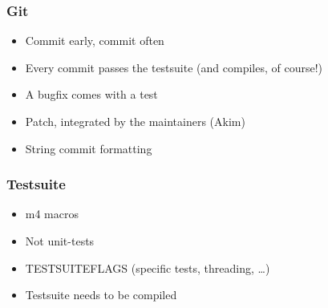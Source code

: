 \documentclass{beamer}
\begin{document}
\begin{frame}
  \frametitle{Git}
    \begin{itemize}
      \item Commit early, commit often
      \item Every commit passes the testsuite (and compiles, of course!)
      \item A bugfix comes with a test
      \item Patch, integrated by the maintainers (Akim)
      \item String commit formatting
    \end{itemize}
\end{frame}

\begin{frame}
  \frametitle{Testsuite}
    \begin{itemize}
      \item m4 macros
      \item Not unit-tests
      \item TESTSUITEFLAGS (specific tests, threading, \ldots)
      \item Testsuite needs to be compiled
    \end{itemize}
\end{frame}
\end{document}
